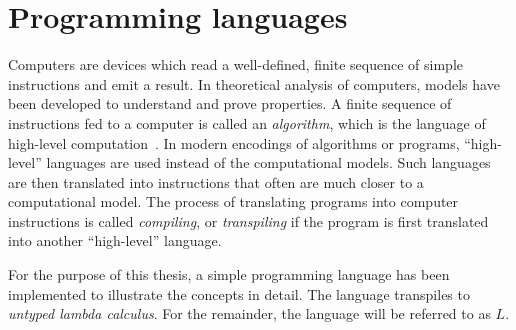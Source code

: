 \documentclass[11pt,oneside,a4paper]{report}
\begin{document}
\chapter{Programming languages}\label{sec:prog}
Computers are devices which read a well-defined, finite sequence of simple instructions and emit a result.
In theoretical analysis of computers, models have been developed to understand and prove properties.
A finite sequence of instructions fed to a computer is called an \textit{algorithm}, which is the language of high-level computation~\cite{copeland1997church}.
In modern encodings of algorithms or programs, ``high-level'' languages are used instead of the computational models.
Such languages are then translated into instructions that often are much closer to a computational model.
The process of translating programs into computer instructions is called \textit{compiling}, or \textit{transpiling} if the program is first translated into another ``high-level'' language.

For the purpose of this thesis, a simple programming language has been implemented to illustrate the concepts in detail.
The language transpiles to \textit{untyped lambda calculus}.
For the remainder, the language will be referred to as $L$.




\end{document}
